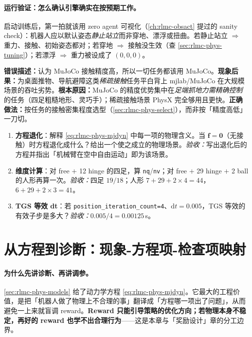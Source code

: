 \paragraph{运行验证：怎么确认引擎确实在按预期工作。}启动训练后，第一拍就该用 zero agent 可视化（\cref{ch:rlmc-obsact} 提过的 sanity check）：机器人应以默认姿态\emph{静止站立}而非穿地、漂浮或扭曲。若静止站立 $\Rightarrow$ 重力、接触、初始姿态都对；若穿地 $\Rightarrow$ 接触没生效（查 \cref{sec:rlmc-phys-tuning}）；若漂浮 $\Rightarrow$ 重力被设成了 $(0,0,0)$。

\begin{pitfall}
\textbf{错误描述：}认为 MuJoCo 接触精度高，所以一切任务都该用 MuJoCo。\textbf{现象后果：}为桌面推物、导航避障这类\emph{稀疏接触}任务平白背上 mjlab/MuJoCo 在大规模场景的吞吐劣势。\textbf{根本原因：}MuJoCo 的精度优势集中在\emph{足端抓地力需精确控制}的任务（四足粗糙地形、灵巧手）；稀疏接触场景 PhysX 完全够用且更快。\textbf{正确做法：}按任务的接触密集程度选型（\cref{sec:rlmc-phys-select}），而非按「精度高低」一刀切。
\end{pitfall}

\begin{practice}[本节练习]
\begin{enumerate}
  \item \textbf{方程退化}：解释 \eqref{eq:rlmc-phys-mjdyn} 中每一项的物理含义。当 $\mathbf f=\mathbf 0$（无接触）时方程退化成什么？给出一个使之成立的物理场景。\emph{验收：}写出退化后的方程并指出「机械臂在空中自由运动」即为该场景。
  \item \textbf{维度计算}：对 free $+$ 12 hinge 的四足，算 \texttt{nq}/\texttt{nv}；对 free $+$ 29 hinge $+$ 2 ball 的人形再算一次。\emph{验收：}四足 $19/18$；人形 $7+29+2\times4=44$，$6+29+2\times3=41$。
  \item \textbf{TGS 等效 dt}：若 \verb|position_iteration_count=4|、$\mathrm dt=0.005$，TGS 等效的有效子步是多大？\emph{验收：}$0.005/4=0.00125$\,s。
\end{enumerate}
\end{practice}

\section{从方程到诊断：现象-方程项-检查项映射}
\label{sec:rlmc-phys-diag}

\paragraph{为什么先讲诊断、再讲调参。}\cref{sec:rlmc-phys-models} 给了动力学方程 \eqref{eq:rlmc-phys-mjdyn}。它最大的工程价值，是把「机器人做了物理上不合理的事」翻译成「方程哪一项出了问题」，从而避免一上来就盲调 reward。\textbf{Reward 只能引导策略的优化方向；若物理本身不稳定，再好的 reward 也学不出合理行为}——这是本章与「奖励设计」章的分工边界。

